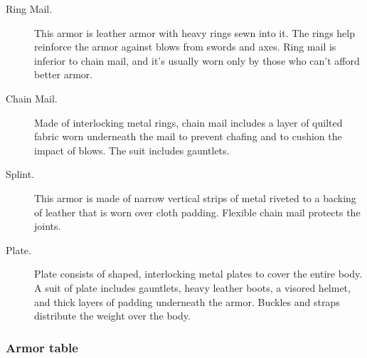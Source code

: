 \begin{description}
\item[Ring Mail.]
This armor is leather armor with heavy rings sewn into it. The rings
help reinforce the armor against blows from swords and axes. Ring mail
is inferior to chain mail, and it's usually worn only by those who can't
afford better armor.
\item[Chain Mail.]
Made of interlocking metal rings, chain mail includes a layer of quilted
fabric worn underneath the mail to prevent chafing and to cushion the
impact of blows. The suit includes gauntlets.
\item[Splint.]
This armor is made of narrow vertical strips of metal riveted to a
backing of leather that is worn over cloth padding. Flexible chain mail
protects the joints.
\item[Plate.]
Plate consists of shaped, interlocking metal plates to cover the entire
body. A suit of plate includes gauntlets, heavy leather boots, a visored
helmet, and thick layers of padding underneath the armor. Buckles and
straps distribute the weight over the body.
\end{description}

\subsubsection{Armor table}\label{equipment-armor-table}

